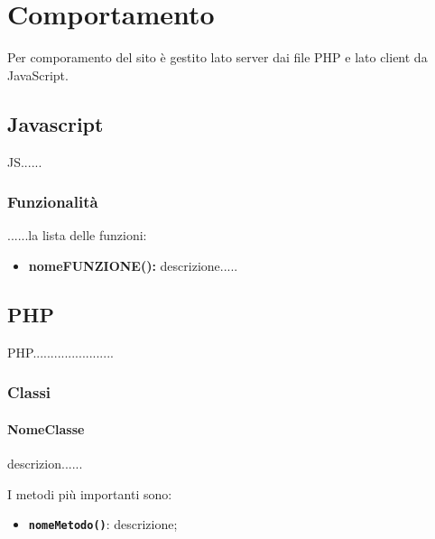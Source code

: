 \section{Comportamento}
Per comporamento del sito è gestito lato server dai file PHP e lato client da JavaScript.

\subsection{Javascript}
JS......

\subsubsection{Funzionalità}
......la lista delle funzioni:
\begin{itemize}
	\item \textbf{nomeFUNZIONE():} descrizione.....\\
\end{itemize}

\subsection{PHP}
PHP.......................

\subsubsection{Classi}
\paragraph{NomeClasse} 
descrizion......

I metodi più importanti sono:
\begin{itemize}
	\item \textbf{\texttt{nomeMetodo()}}: descrizione;

\end{itemize}


